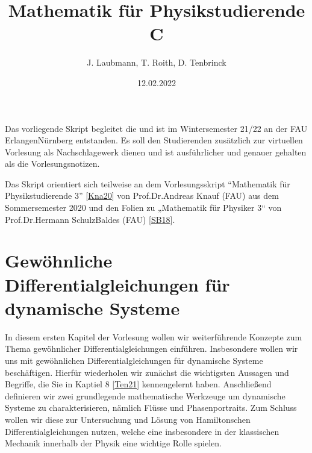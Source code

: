 \documentclass[letterpaper,10pt,german]{jupyterBook}
\title{Mathematik für Physikstudierende C}
\date{12.02.2022}
\author{J.\@{} Laubmann, T.\@{} Roith, D.\@{} Tenbrinck}
\begin{document}
\pagestyle{empty}
\sphinxmaketitle
\pagestyle{plain}
\sphinxtableofcontents
\pagestyle{normal}
\label{\detokenize{intro::doc}}

\begin{sphinxVerbatimOutput}

\noindent{}
\end{sphinxVerbatimOutput}

\sphinxAtStartPar
Das vorliegende Skript begleitet die  und ist im Wintersemester 21/22 an der FAU Erlangen\sphinxhyphen{}Nürnberg entstanden. Es soll den Studierenden zusätzlich zur virtuellen Vorlesung als Nachschlagewerk dienen und ist ausführlicher und genauer gehalten als die Vorlesungsnotizen.

\begin{DUlineblock}{0em}
\item[] 
\end{DUlineblock}

\sphinxAtStartPar
Das Skript orientiert sich teilweise an dem Vorlesungsskript “Mathematik für Physikstudierende 3” {[}\hyperlink{cite.references:id9}{Kna20}{]} von Prof.Dr.Andreas Knauf (FAU) aus dem Sommersemester 2020 und den Folien zu „Mathematik für Physiker 3“ von Prof.Dr.Hermann Schulz\sphinxhyphen{}Baldes (FAU) {[}\hyperlink{cite.references:id12}{SB18}{]}.


\chapter{Gewöhnliche Differentialgleichungen für dynamische Systeme}
\label{\detokenize{ode/ode:gewohnliche-differentialgleichungen-fur-dynamische-systeme}}\label{\detokenize{ode/ode::doc}}
\sphinxAtStartPar
In diesem ersten Kapitel der Vorlesung wollen wir weiterführende Konzepte zum Thema gewöhnlicher Differentialgleichungen einführen.
Insbesondere wollen wir uns mit gewöhnlichen Differentialgleichungen für dynamische Systeme beschäftigen.
Hierfür wiederholen wir zunächst die wichtigsten Aussagen und Begriffe, die Sie in Kaptiel 8 {[}\hyperlink{cite.references:id15}{Ten21}{]} kennengelernt haben.
Anschließend definieren wir zwei grundlegende mathematische Werkzeuge um dynamische Systeme zu charakterisieren, nämlich Flüsse und Phasenportraits.
Zum Schluss wollen wir diese zur Untersuchung und Lösung von Hamiltonschen Differentialgleichungen nutzen, welche eine insbesondere in der klassischen Mechanik innerhalb der Physik eine wichtige Rolle spielen.
\end{document}
